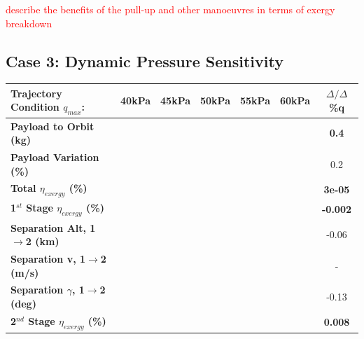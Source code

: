 \textcolor{red}{describe the benefits of the pull-up and other manoeuvres in terms of exergy breakdown}


\subsection{Case 3: Dynamic Pressure Sensitivity}\label{sec:qvariation}


\begin{table}[ht!]
	\centering
	\begin{tabular}{l c c c c c c} 
		\hline \textbf{Trajectory Condition  \qquad  $q_{max}$: }
		&40kPa
		&45kPa
		&50kPa
		& 55kPa
		& 60kPa
		& $\Delta/\Delta$\%q
	\\
	\hline \textbf{Payload to Orbit (kg)}
	& \textbf{\PayloadToOrbitqFortyNoReturn}
	& \textbf{\PayloadToOrbitqFortyFiveNoReturn}
	& \textbf{\PayloadToOrbitqStandardNoReturn}
	& \textbf{\PayloadToOrbitqFiftyFiveNoReturn}
	& \textbf{\PayloadToOrbitqSixtyNoReturn}
	&\textbf{0.4}
	\\
	\textbf{Payload Variation (\%)}
	& \PayloadVarqFortyNoReturn
	& \PayloadVarqFortyFiveNoReturn
	& \PayloadVarqStandardNoReturn
	& \PayloadVarqFiftyFiveNoReturn
	& \PayloadVarqSixtyNoReturn
	&0.2
	\\
	\textbf{Total $\eta_{exergy}$ (\%)}
	& \textbf{\totalExergyEffqFortyNoReturn}
	& \textbf{\totalExergyEffqFortyFiveNoReturn}
	& \textbf{\totalExergyEffqStandardNoReturn}
	& \textbf{\totalExergyEffqFiftyFiveNoReturn}
	& \textbf{\totalExergyEffqSixtyNoReturn}
	& \textbf{3e-05}
	\\
	\hline 
	\textbf{1$^{st}$ Stage $\eta_{exergy}$ (\%)}
	& \textbf{\firstExergyEffqFortyNoReturn}
	& \textbf{\firstExergyEffqFortyFiveNoReturn}
	& \textbf{\firstExergyEffqStandardNoReturn}
	& \textbf{\firstExergyEffqFiftyFiveNoReturn}
	& \textbf{\firstExergyEffqSixtyNoReturn}
	& \textbf{-0.002}
	\\

	\textbf{Separation Alt, 1$\rightarrow$2 (km)}
	& \firstsecondSeparationAltqFortyNoReturn
	& \firstsecondSeparationAltqFortyFiveNoReturn
	& \firstsecondSeparationAltqStandardNoReturn
	& \firstsecondSeparationAltqFiftyFiveNoReturn
	& \firstsecondSeparationAltqSixtyNoReturn
	&-0.06
	\\
	\textbf{Separation v, 1$\rightarrow$2 (m/s)}
	& \firstsecondSeparationvqFortyNoReturn
	& \firstsecondSeparationvqFortyFiveNoReturn
	& \firstsecondSeparationvqStandardNoReturn
	& \firstsecondSeparationvqFiftyFiveNoReturn
	& \firstsecondSeparationvqSixtyNoReturn
	& -
	\\
	\textbf{Separation $\gamma$, 1$\rightarrow$2 (deg)}
	& \firstsecondSeparationgammaqFortyNoReturn
	& \firstsecondSeparationgammaqFortyFiveNoReturn
	& \firstsecondSeparationgammaqStandardNoReturn
	& \firstsecondSeparationgammaqFiftyFiveNoReturn
	& \firstsecondSeparationgammaqSixtyNoReturn
	&-0.13
	\\
	\hline 
	\textbf{2$^{nd}$ Stage $\eta_{exergy}$ (\%)}
	& \textbf{\secondExergyEffqFortyNoReturn}
	& \textbf{\secondExergyEffqFortyFiveNoReturn}
	& \textbf{\secondExergyEffqStandardNoReturn}
	& \textbf{\secondExergyEffqFiftyFiveNoReturn}
	& \textbf{\secondExergyEffqSixtyNoReturn}
	& \textbf{0.008}
	\\


\end{tabular}
\end{table}
